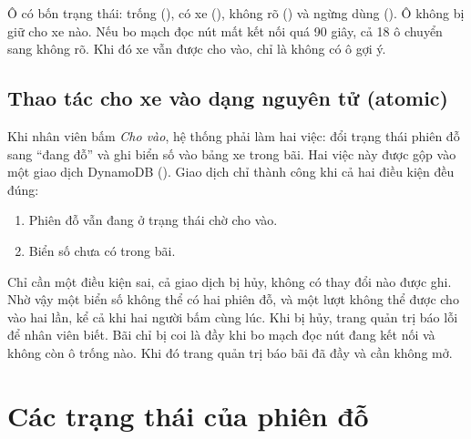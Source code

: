 Ô có bốn trạng thái: trống (), có xe (), không rõ () và ngừng dùng (). Ô không bị giữ cho xe nào. Nếu bo mạch đọc nút mất kết nối quá 90 giây, cả 18 ô chuyển sang không rõ. Khi đó xe vẫn được cho vào, chỉ là không có ô gợi ý.

\subsection{Thao tác cho xe vào dạng nguyên tử (atomic)}

Khi nhân viên bấm \emph{Cho vào}, hệ thống phải làm hai việc: đổi trạng thái phiên đỗ sang ``đang đỗ'' và ghi biển số vào bảng xe trong bãi. Hai việc này được gộp vào một giao dịch DynamoDB (). Giao dịch chỉ thành công khi cả hai điều kiện đều đúng:

\begin{enumerate}
  \item Phiên đỗ vẫn đang ở trạng thái chờ cho vào.
  \item Biển số chưa có trong bãi.
\end{enumerate}

Chỉ cần một điều kiện sai, cả giao dịch bị hủy, không có thay đổi nào được ghi. Nhờ vậy một biển số không thể có hai phiên đỗ, và một lượt không thể được cho vào hai lần, kể cả khi hai người bấm cùng lúc. Khi bị hủy, trang quản trị báo lỗi để nhân viên biết. Bãi chỉ bị coi là đầy khi bo mạch đọc nút đang kết nối và không còn ô trống nào. Khi đó trang quản trị báo bãi đã đầy và cần không mở.

\section{Các trạng thái của phiên đỗ}

